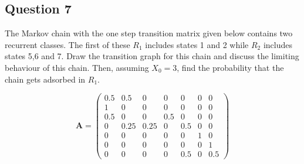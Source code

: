 \documentclass[a4paper]{article}
\begin{document}
\subsection{Question 7}

The Markov chain with the one step transition matrix given below contains two recurrent classes.  The first of these $R_1$ includes states 1 and 2 while $R_2$ includes states 5,6 and 7.  Draw the transition graph for this chain and discuss the limiting behaviour of this chain.  Then, assuming $X_0=3$, find the probability that the chain gets adsorbed in $R_1$.

$$
\mathbf{A} = 
\left(
\begin{matrix}
0.5 & 0.5 & 0 & 0 & 0 & 0 & 0 \\
1 & 0 & 0 & 0 & 0 & 0 & 0 \\
0.5 & 0 & 0 & 0.5 & 0 & 0 & 0 \\
0 & 0.25 & 0.25 & 0 & 0.5 & 0 & 0 \\
0 & 0 & 0 & 0 & 0 &  1 & 0 \\
0 & 0 & 0 & 0 & 0 & 0 & 1 \\
0 & 0 & 0 & 0 & 0.5 & 0 & 0.5
\end{matrix}
\right)
$$
\end{document}
